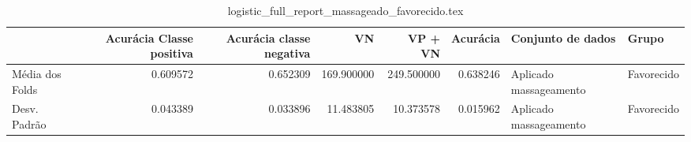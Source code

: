 \begin{table}
\centering
\caption{logistic_full_report_massageado_favorecido.tex}
\label{logistic_full_report_massageado_favorecido.tex}
\begin{tabular}{lrrrrrll}
\toprule
{} &  Acurácia Classe positiva &  Acurácia classe negativa &         VN  &    VP + VN  &  Acurácia &       Conjunto de dados &       Grupo \\
\midrule
Média dos Folds &                  0.609572 &                  0.652309 &  169.900000 &  249.500000 &  0.638246 &  Aplicado massageamento &  Favorecido \\
Desv. Padrão    &                  0.043389 &                  0.033896 &   11.483805 &   10.373578 &  0.015962 &  Aplicado massageamento &  Favorecido \\
\bottomrule
\end{tabular}
\end{table}
